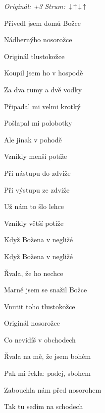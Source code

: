 \begin{song}


\begin{headerbox}
 \quad
\textit{Originál: +3} \quad
\textit{Strum:} $\Down\Up\Down\Up$
\end{headerbox}

\begin{vchordbox}
\end{vchordbox}

\Large

\bigskip

Přivedl jsem domů Božce \par
{}Nádhernýho nosorožce \par
{}Originál tlustokožce \par
{}Koupil jsem ho v hospodě \par
{}Za dva rumy a dvě vodky \par
{}Připadal mi velmi krotký \par
{}Pošlapal mi polobotky \par
{}Ale jinak v pohodě \par

\bigskip

Vznikly menší potíže \par
{}Při nástupu do zdviže \par
{}Při výstupu ze zdviže \par
{}Už nám to šlo lehce \par
{}Vznikly větší potíže \par
{}Když Božena v negližé \par
{}Když Božena v negližé \par
{}Řvala, že ho nechce \par

\bigskip

Marně jsem se snažil Božce \par
{}Vnutit toho tlustokožce \par
{}Originál nosorožce \par
{}Co nevidíš v obchodech \par
{}Řvala na mě, že jsem bohém \par
{}Pak mi řekla: padej, sbohem \par
{}Zabouchla nám před nosorohem \par
{}Tak tu sedím na schodech \par


\end{song}

